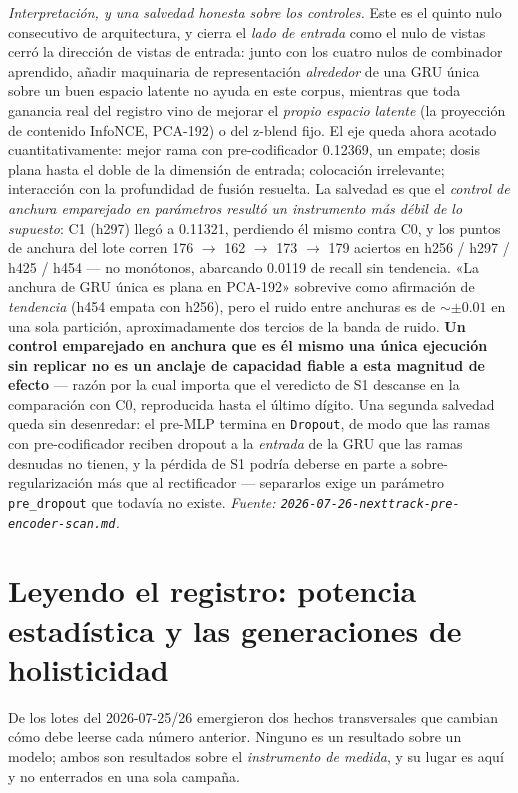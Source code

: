 \documentclass[11pt]{article}
\begin{document}
\emph{Interpretación, y una salvedad honesta sobre los controles.} Este es el
quinto nulo consecutivo de arquitectura, y cierra el \emph{lado de entrada} como
el nulo de vistas cerró la dirección de vistas de entrada: junto con los cuatro
nulos de combinador aprendido, añadir maquinaria de representación
\emph{alrededor} de una GRU única sobre un buen espacio latente no ayuda en este
corpus, mientras que toda ganancia real del registro vino de mejorar el
\emph{propio espacio latente} (la proyección de contenido InfoNCE, PCA-192) o del
z-blend fijo. El eje queda ahora acotado cuantitativamente: mejor rama con
pre-codificador \num{0.12369}, un empate; dosis plana hasta el doble de la
dimensión de entrada; colocación irrelevante; interacción con la profundidad de
fusión resuelta. La salvedad es que el \emph{control de anchura emparejado en
parámetros resultó un instrumento más débil de lo supuesto}: C1 (h297) llegó a
\num{0.11321}, perdiendo él mismo contra C0, y los puntos de anchura del lote
corren \num{176} $\to$ \num{162} $\to$ \num{173} $\to$ \num{179} aciertos en h256
/ h297 / h425 / h454 --- no monótonos, abarcando \num{0.0119} de recall sin
tendencia. «La anchura de GRU única es plana en PCA-192» sobrevive como
afirmación de \emph{tendencia} (h454 empata con h256), pero el ruido entre
anchuras es de ${\sim}\pm\num{0.01}$ en una sola partición, aproximadamente dos
tercios de la banda de ruido. \textbf{Un control emparejado en anchura que es él
mismo una única ejecución sin replicar no es un anclaje de capacidad fiable a
esta magnitud de efecto} --- razón por la cual importa que el veredicto de S1
descanse en la comparación con C0, reproducida hasta el último dígito. Una
segunda salvedad queda sin desenredar: el pre-MLP termina en \texttt{Dropout}, de
modo que las ramas con pre-codificador reciben dropout a la \emph{entrada} de la
GRU que las ramas desnudas no tienen, y la pérdida de S1 podría deberse en parte
a sobre-regularización más que al rectificador --- separarlos exige un parámetro
\texttt{pre\_dropout} que todavía no existe.
\emph{Fuente: \texttt{2026-07-26-nexttrack-pre-encoder-scan.md}.}

\section{Leyendo el registro: potencia estadística y las generaciones de holisticidad}
\label{sec:power}
De los lotes del 2026-07-25/26 emergieron dos hechos transversales que cambian
cómo debe leerse cada número anterior. Ninguno es un resultado sobre un modelo;
ambos son resultados sobre el \emph{instrumento de medida}, y su lugar es aquí y
no enterrados en una sola campaña.
\end{document}
